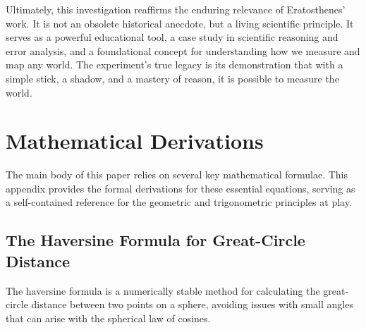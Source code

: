 \documentclass[11pt]{article}
\begin{document}
Ultimately, this investigation reaffirms the enduring relevance of Eratosthenes' work. It is not an obsolete historical anecdote, but a living scientific principle. It serves as a powerful educational tool, a case study in scientific reasoning and error analysis, and a foundational concept for understanding how we measure and map any world. The experiment's true legacy is its demonstration that with a simple stick, a shadow, and a mastery of reason, it is possible to measure the world.





\appendix
\section{Mathematical Derivations}

The main body of this paper relies on several key mathematical formulae. This appendix provides the formal derivations for these essential equations, serving as a self-contained reference for the geometric and trigonometric principles at play.

\subsection{The Haversine Formula for Great-Circle Distance}

The haversine formula is a numerically stable method for calculating the great-circle distance between two points on a sphere, avoiding issues with small angles that can arise with the spherical law of cosines.
\end{document}
